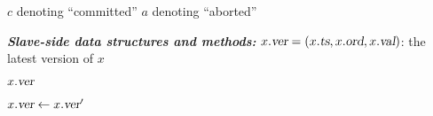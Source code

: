 \begin{algorithm}[H]
\begin{algorithmic}[1]
      \State \Return $c$ denoting ``committed''
    \EndIf
    \State \Return $a$ denoting ``aborted''
    \EndProcedure

    \Statex \hrulefill

    \Statex \textbf{\textit{Slave-side data structures and methods:}}
    \Statex $x.\textsl{ver} = (x.\textsl{ts}, x.\textsl{ord}, x.\textsl{val})$: the latest version of $x$
    \hStatex

    \State \Return $x.\textsl{ver}$
    \EndProcedure

    \algrenewcommand{}
     \label{line:received}
      \State $x.\textsl{ver} \gets x.\textsl{ver}'$
      \EndIf
    \EndFor
    \EndProcedure
  \end{algorithmic}
\end{algorithm}
